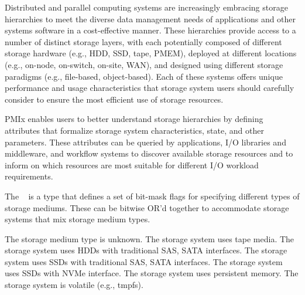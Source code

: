 \label{chap:api_storage}

Distributed and parallel computing systems are increasingly embracing storage hierarchies to meet the diverse data management needs of applications and other systems software in a cost-effective manner.
These hierarchies provide access to a number of distinct storage layers, with each potentially composed of different storage hardware (e.g., HDD, SSD, tape, PMEM), deployed at different locations (e.g., on-node, on-switch, on-site, WAN), and designed using different storage paradigms (e.g., file-based, object-based).
Each of these systems offers unique performance and usage characteristics that storage system users should carefully consider to ensure the most efficient use of storage resources.

PMIx enables users to better understand storage hierarchies by defining attributes that formalize storage system characteristics, state, and other parameters.
These attributes can be queried by applications, I/O libraries and middleware, and workflow systems to discover available storage resources and to inform on which resources are most suitable for different I/O workload requirements.


The ~\provisionalMarker{} is a  type that defines a set of bit-mask flags for specifying different types of storage mediums. These can be bitwise OR'd together to accommodate storage systems that mix storage medium types.

\begin{constantdesc}
%
The storage medium type is unknown.
%
The storage system uses tape media.
%
The storage system uses HDDs with traditional SAS, SATA interfaces.
%
The storage system uses SSDs with traditional SAS, SATA interfaces.
%
The storage system uses SSDs with NVMe interface.
%
The storage system uses persistent memory.
%
The storage system is volatile (e.g., tmpfs).
%
\end{constantdesc}

